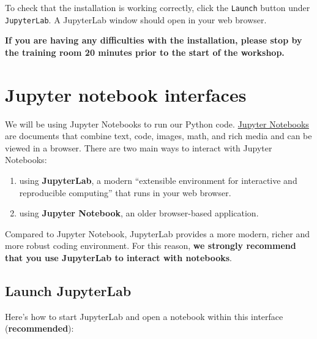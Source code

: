 \documentclass[
]{book}
\providecommand{\tightlist}{%
  \setlength{\itemsep}{0pt}\setlength{\parskip}{0pt}}
\begin{document}
To check that the installation is working correctly, click the \texttt{Launch} button under \texttt{JupyterLab}. A JupyterLab window should open in your web browser.

\begin{alert}

\textbf{If you are having any difficulties with the installation, please stop by the training room 20 minutes prior to the start of the workshop.}

\end{alert}

\hypertarget{jupyter-notebook-interfaces}{%
\section{Jupyter notebook interfaces}\label{jupyter-notebook-interfaces}}

We will be using Jupyter Notebooks to run our Python code. \href{https://jupyter-notebook.readthedocs.io/en/stable/}{Jupyter Notebooks} are documents that combine text, code, images, math, and rich media and can be viewed in a browser. There are two main ways to interact with Jupyter Notebooks:

\begin{enumerate}
\def\labelenumi{\arabic{enumi}.}
\tightlist
\item
  using \textbf{JupyterLab}, a modern ``extensible environment for interactive and reproducible computing'' that runs in your web browser.
\item
  using \textbf{Jupyter Notebook}, an older browser-based application.
\end{enumerate}

Compared to Jupyter Notebook, JupyterLab provides a more modern, richer and more robust coding environment. For this reason, \textbf{we strongly recommend that you use JupyterLab to interact with notebooks}.

\hypertarget{launch-jupyterlab}{%
\subsection{Launch JupyterLab}\label{launch-jupyterlab}}

Here's how to start JupyterLab and open a notebook within this interface (\textbf{recommended}):
\end{document}
